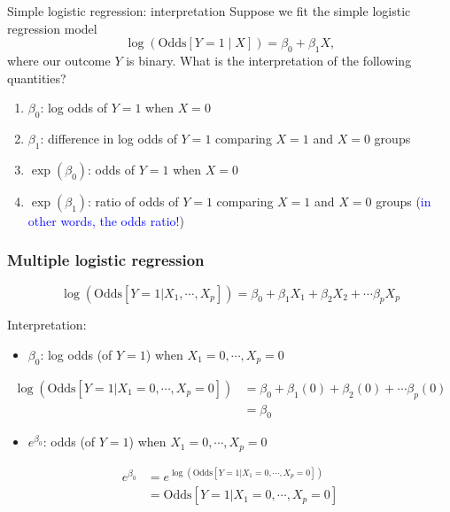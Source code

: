 \documentclass[10pt,t]{beamer}
\begin{document}
\begin{frame}{Simple logistic regression: interpretation}
	Suppose we fit the simple logistic regression model $$\log\left(\text{Odds}[Y =1 \mid X]\right) = \beta_0 + \beta_1 X,$$ where our outcome $Y$ is binary. What is the interpretation of the following quantities?
	\begin{enumerate}
		\item $\beta_0$: log odds of $Y = 1$ when $X = 0$ \pause
		\item $\beta_1$: difference in log odds of $Y = 1$ comparing $X = 1$ and $X =0$ groups \pause
		\item $\exp(\beta_0)$: odds of $Y = 1$ when $X = 0$ \pause
		\item $\exp(\beta_1)$: ratio of odds of $Y = 1$ comparing $X = 1$ and $X = 0$ groups (\textcolor{blue}{in other words, the odds ratio!})
	\end{enumerate} 
\end{frame}

\begin{frame}
	\frametitle{Multiple logistic regression}
	\vspace{-1.5cm}
	$$\log\left(\text{Odds}[Y =1 |X_1,\cdots,X_p]\right) = \beta_0 + \beta_1 X_1 + \beta_2X_2 + \cdots \beta_p X_p$$
	
	\color{blue} Interpretation: \color{black}
	\begin{itemize}  \color{red}
		\item $\beta_0$: \pause log odds (of $Y=1$) when $X_1 = 0, \cdots, X_p = 0$ \pause
	\end{itemize}
	\vspace{-0.3cm}
	\begin{footnotesize}
		\begin{align*}
			\log\left(\text{Odds}[Y =1 |X_1=0,\cdots,X_p=0]\right) & = \beta_0 + \beta_1 (0) + \beta_2(0) + \cdots \beta_p (0) \\
			& = \beta_0 
		\end{align*} \pause
	\end{footnotesize}
	
	\vspace{-0.6cm}
	\begin{itemize}   \color{red}
		\item $e^{\beta_0}$: \pause odds (of $Y=1$) when $X_1 = 0, \cdots, X_p = 0$ \pause
	\end{itemize}
	\vspace{-0.3cm}
	\begin{footnotesize}
		\begin{align*}
			e^{\beta_0} & = e^{\log\left(\text{Odds}[Y =1 |X_1=0,\cdots,X_p=0]\right)} \\
			& = \text{Odds}[Y =1 |X_1=0,\cdots,X_p=0]
		\end{align*}
	\end{footnotesize}
\end{frame}
\end{document}
